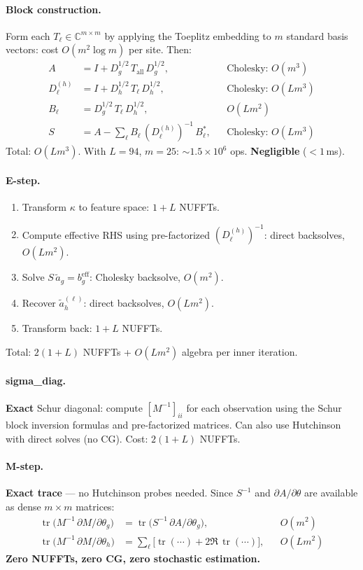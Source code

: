 \documentclass[11pt]{article}
\newcommand{\C}{\mathbb{C}}
\newcommand{\tr}{\operatorname{tr}}
\begin{document}
\paragraph{Block construction.}
Form each $T_\ell \in \C^{m \times m}$ by applying the Toeplitz
embedding to $m$ standard basis vectors: cost $O(m^2 \log m)$ per site.
Then:
\begin{align}
  A &= I + D_g^{1/2}\, T_{\mathrm{all}}\, D_g^{1/2}, &
  &\text{Cholesky: } O(m^3) \\
  D_\ell^{(h)} &= I + D_h^{1/2}\, T_\ell\, D_h^{1/2}, &
  &\text{Cholesky: } O(Lm^3) \\
  B_\ell &= D_g^{1/2}\, T_\ell\, D_h^{1/2}, &
  &O(Lm^2) \\
  S &= A - \textstyle\sum_\ell B_\ell\, (D_\ell^{(h)})^{-1}\, B_\ell^*, &
  &\text{Cholesky: } O(Lm^3)
\end{align}
Total: $O(Lm^3)$. With $L{=}94$, $m{=}25$: $\sim 1.5 \times 10^6$
ops. \textbf{Negligible} ($< 1$\,ms).

\paragraph{E-step.}
\begin{enumerate}
\item Transform $\kappa$ to feature space: $1{+}L$ NUFFTs.
\item Compute effective RHS using pre-factorized
  $(D_\ell^{(h)})^{-1}$: direct backsolves, $O(Lm^2)$.
\item Solve $S\,\tilde a_g = b_g^{\text{eff}}$: Cholesky backsolve,
  $O(m^2)$.
\item Recover $\tilde a_h^{(\ell)}$: direct backsolves, $O(Lm^2)$.
\item Transform back: $1{+}L$ NUFFTs.
\end{enumerate}
Total: $2(1{+}L)$ NUFFTs + $O(Lm^2)$ algebra per inner iteration.

\paragraph{sigma\_diag.}
\textbf{Exact} Schur diagonal: compute $[M^{-1}]_{ii}$ for each
observation using the Schur block inversion formulas and
pre-factorized matrices. Can also use Hutchinson with direct
solves (no CG). Cost: $2(1{+}L)$ NUFFTs.

\paragraph{M-step.}
\textbf{Exact trace} --- no Hutchinson probes needed.
Since $S^{-1}$ and $\partial A/\partial\theta$ are available as
dense $m{\times}m$ matrices:
\begin{align}
  \tr\bigl(M^{-1}\, \partial M / \partial\theta_g\bigr)
  &= \tr\bigl(S^{-1}\, \partial A / \partial\theta_g\bigr), &
  &O(m^2) \\
  \tr\bigl(M^{-1}\, \partial M / \partial\theta_h\bigr)
  &= \sum_\ell \bigl[\tr(\cdots) + 2\Re\,\tr(\cdots)\bigr], &
  &O(Lm^2)
\end{align}
\textbf{Zero NUFFTs, zero CG, zero stochastic estimation.}
\end{document}

